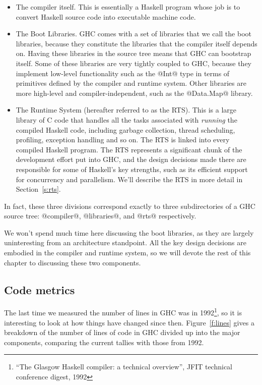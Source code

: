 \documentclass{article}
\begin{document}
\begin{itemize}
\item The compiler itself.  This is essentially a Haskell program
  whose job is to convert Haskell source code into executable machine
  code.

\item The Boot Libraries.  GHC comes with a set of libraries that we
  call the boot libraries, because they constitute the
  libraries that the compiler itself depends on.  Having these
  libraries in the source tree means that GHC can bootstrap itself.
  Some of these libraries are very tightly coupled to GHC, because
  they implement low-level functionality such as the @Int@ type in
  terms of primitives defined by the compiler and runtime system.
  Other libraries are more high-level and compiler-independent, such
  as the @Data.Map@ library.

\item The Runtime System (hereafter referred to as the RTS).  This is
  a large library of C code that handles all the tasks associated with
  \emph{running} the compiled Haskell code, including garbage
  collection, thread scheduling, profiling, exception handling and so
  on.  The RTS is linked into every compiled Haskell program.  The RTS
  represents a significant chunk of the development effort put into
  GHC, and the design decisions made there are responsible for some of
  Haskell's key strengths, such as its efficient support for
  concurrency and parallelism.  We'll describe the RTS in more detail
  in Section~\ref{s:rts}.
\end{itemize}

In fact, these three divisions correspond exactly to three
subdirectories of a GHC source tree: @compiler@, @libraries@, and
@rts@ respectively.

We won't spend much time here discussing the boot libraries, as they
are largely uninteresting from an architecture standpoint.  All the
key design decisions are embodied in the compiler and runtime system,
so we will devote the rest of this chapter to discussing these two
components.

\subsection{Code metrics}

The last time we measured the number of lines in GHC was in
1992\footnote{``The Glasgow Haskell compiler: a technical overview'',
  JFIT technical conference digest, 1992}, so it is interesting to
look at how things have changed since then.  Figure~\ref{f:lines}
gives a breakdown of the number of lines of code in GHC divided up
into the major components, comparing the current tallies with those
from 1992.
\end{document}
